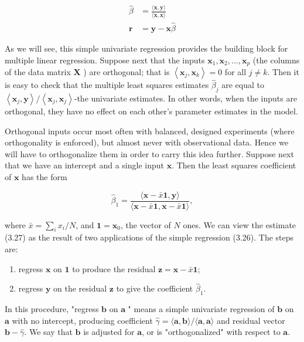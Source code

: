 \documentclass[10pt]{article}
\begin{document}
\begin{align*}
\hat{\beta} & =\frac{\langle\mathbf{x}, \mathbf{y}\rangle}{\langle\mathbf{x}, \mathbf{x}\rangle}  \tag{3.26}\\
\mathbf{r} & =\mathbf{y}-\mathbf{x} \hat{\beta}
\end{align*}


As we will see, this simple univariate regression provides the building block for multiple linear regression. Suppose next that the inputs $\mathbf{x}_{1}, \mathbf{x}_{2}, \ldots, \mathbf{x}_{p}$ (the columns of the data matrix $\mathbf{X}$ ) are orthogonal; that is $\left\langle\mathbf{x}_{j}, \mathbf{x}_{k}\right\rangle=0$ for all $j \neq k$. Then it is easy to check that the multiple least squares estimates $\hat{\beta}_{j}$ are equal to $\left\langle\mathbf{x}_{j}, \mathbf{y}\right\rangle /\left\langle\mathbf{x}_{j}, \mathbf{x}_{j}\right\rangle$-the univariate estimates. In other words, when the inputs are orthogonal, they have no effect on each other's parameter estimates in the model.

Orthogonal inputs occur most often with balanced, designed experiments (where orthogonality is enforced), but almost never with observational data. Hence we will have to orthogonalize them in order to carry this idea further. Suppose next that we have an intercept and a single input $\mathbf{x}$. Then the least squares coefficient of $\mathbf{x}$ has the form


\begin{equation*}
\hat{\beta}_{1}=\frac{\langle\mathbf{x}-\bar{x} \mathbf{1}, \mathbf{y}\rangle}{\langle\mathbf{x}-\bar{x} \mathbf{1}, \mathbf{x}-\bar{x} \mathbf{1}\rangle}, \tag{3.27}
\end{equation*}


where $\bar{x}=\sum_{i} x_{i} / N$, and $\mathbf{1}=\mathbf{x}_{0}$, the vector of $N$ ones. We can view the estimate (3.27) as the result of two applications of the simple regression (3.26). The steps are:

\begin{enumerate}
  \item regress $\mathbf{x}$ on $\mathbf{1}$ to produce the residual $\mathbf{z}=\mathbf{x}-\bar{x} \mathbf{1}$;
  \item regress $\mathbf{y}$ on the residual $\mathbf{z}$ to give the coefficient $\hat{\beta}_{1}$.
\end{enumerate}

In this procedure, "regress $\mathbf{b}$ on $\mathbf{a}$ " means a simple univariate regression of $\mathbf{b}$ on $\mathbf{a}$ with no intercept, producing coefficient $\hat{\gamma}=\langle\mathbf{a}, \mathbf{b}\rangle /\langle\mathbf{a}, \mathbf{a}\rangle$ and residual vector $\mathbf{b}-\hat{\gamma}$. We say that $\mathbf{b}$ is adjusted for $\mathbf{a}$, or is "orthogonalized" with respect to $\mathbf{a}$.
\end{document}
